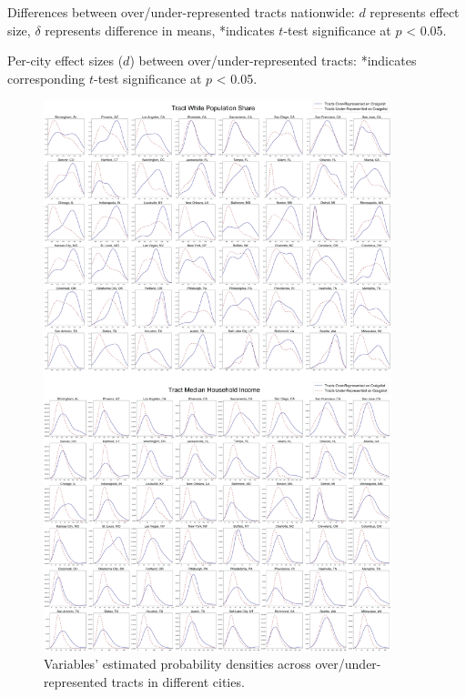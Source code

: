 \documentclass[11pt,onecolumn]{article} %
\begin{document}
\begin{table}[tbp]
	\centering
	\small
	\caption{Differences between over/under-represented tracts nationwide: $d$ represents effect size, $\delta$ represents difference in means, *indicates $t$-test significance at $p$ < 0.05.}
	\label{tab:effects_over_under}
	
\end{table}

\begin{table}[tbp]
	\scriptsize
	\centering
	\caption{Per-city effect sizes ($d$) between over/under-represented tracts: *indicates corresponding $t$-test significance at $p$ < 0.05.}
	\label{tab:effects_cities}
	
\end{table}

\begin{figure}[tbp]
	\centering
	\includegraphics[width=0.9\textwidth]{fig_var_dists_cities.png}
	\caption{Variables' estimated probability densities across over/under-represented tracts in different cities.}
	\label{fig:var_dists_cities}
\end{figure}
\end{document}
